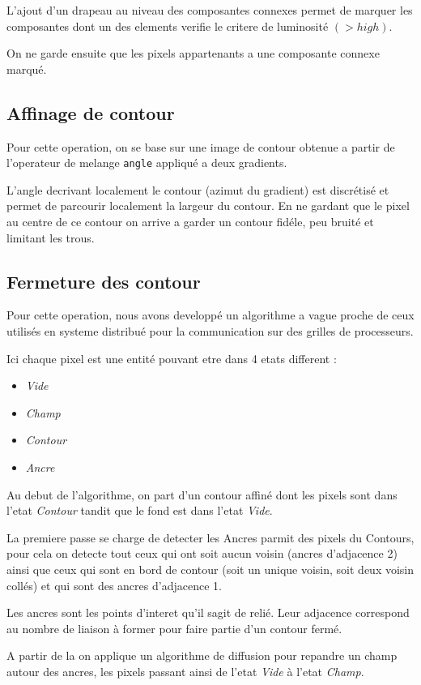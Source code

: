 L'ajout d'un drapeau au niveau des composantes connexes permet de marquer les composantes dont un des elements verifie le critere de luminosité $(>high)$.

On ne garde ensuite que les pixels appartenants a une composante connexe marqué.

\subsection*{Affinage de contour}
Pour cette operation, on se base sur une image de contour obtenue a partir de l'operateur de melange \texttt{angle} appliqué a deux gradients.

L'angle decrivant localement le contour (azimut du gradient) est discrétisé et permet de parcourir localement la largeur du contour. En ne gardant que le pixel au centre de ce contour on arrive a garder un contour fidéle, peu bruité et limitant les trous.

\subsection*{Fermeture des contour}
Pour cette operation, nous avons developpé un algorithme a vague proche de ceux utilisés en systeme distribué pour la communication sur des grilles de processeurs.

Ici chaque pixel est une entité pouvant etre dans 4 etats different :
\begin{itemize}
	\item \emph{Vide}
	\item \emph{Champ}
	\item \emph{Contour}
	\item \emph{Ancre}
\end{itemize}

Au debut de l'algorithme, on part d'un contour affiné dont les pixels sont dans l'etat \emph{Contour} tandit que le fond est dans l'etat \emph{Vide}.

La premiere passe se charge de detecter les Ancres parmit des pixels du Contours, pour cela on detecte tout ceux qui ont soit aucun voisin (ancres d'adjacence 2) ainsi que ceux qui sont en bord de contour (soit un unique voisin, soit deux voisin collés) et qui sont des ancres d'adjacence 1.

Les ancres sont les points d'interet qu'il sagit de relié. Leur adjacence correspond au nombre de liaison à former pour faire partie d'un contour fermé.

A partir de la on applique un algorithme de diffusion pour repandre un champ autour des ancres, les pixels passant ainsi de l'etat \emph{Vide} à l'etat \emph{Champ}.

